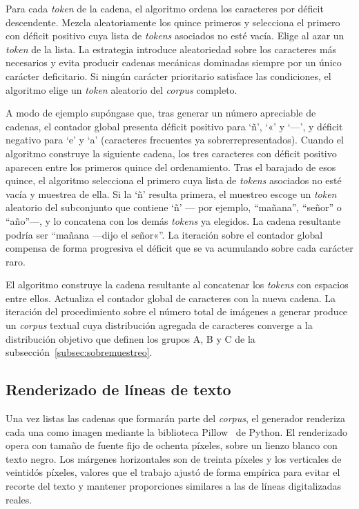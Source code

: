 Para cada \textit{token} de la cadena, el algoritmo ordena los caracteres por déficit descendente. Mezcla aleatoriamente los quince primeros y selecciona el primero con déficit positivo cuya lista de \textit{tokens} asociados no esté vacía. Elige al azar un \textit{token} de la lista. La estrategia introduce aleatoriedad sobre los caracteres más necesarios y evita producir cadenas mecánicas dominadas siempre por un único carácter deficitario. Si ningún carácter prioritario satisface las condiciones, el algoritmo elige un \textit{token} aleatorio del \textit{corpus} completo.

A modo de ejemplo supóngase que, tras generar un número apreciable de cadenas, el contador global presenta déficit positivo para `ñ', `«' y `—', y déficit negativo para `e' y `a' (caracteres frecuentes ya sobrerrepresentados). Cuando el algoritmo construye la siguiente cadena, los tres caracteres con déficit positivo aparecen entre los primeros quince del ordenamiento. Tras el barajado de esos quince, el algoritmo selecciona el primero cuya lista de \textit{tokens} asociados no esté vacía y muestrea de ella. Si la `ñ' resulta primera, el muestreo escoge un \textit{token} aleatorio del subconjunto que contiene `ñ' --- por ejemplo, ``mañana'', ``señor'' o ``año''---, y lo concatena con los demás \textit{tokens} ya elegidos. La cadena resultante podría ser ``mañana —dijo el señor«''. La iteración sobre el contador global compensa de forma progresiva el déficit que se va acumulando sobre cada carácter raro.

El algoritmo construye la cadena resultante al concatenar los \textit{tokens} con espacios entre ellos. Actualiza el contador global de caracteres con la nueva cadena. La iteración del procedimiento sobre el número total de imágenes a generar produce un \textit{corpus} textual cuya distribución agregada de caracteres converge a la distribución objetivo que definen los grupos A, B y C de la subsección~\ref{subsec:sobremuestreo}.

\subsection{Renderizado de líneas de texto}
\label{subsec:renderizado}

Una vez listas las cadenas que formarán parte del \textit{corpus}, el generador renderiza cada una como imagen mediante la biblioteca Pillow~\cite{pillow} de Python. El renderizado opera con tamaño de fuente fijo de ochenta píxeles, sobre un lienzo blanco con texto negro. Los márgenes horizontales son de treinta píxeles y los verticales de veintidós píxeles, valores que el trabajo ajustó de forma empírica para evitar el recorte del texto y mantener proporciones similares a las de líneas digitalizadas reales.

